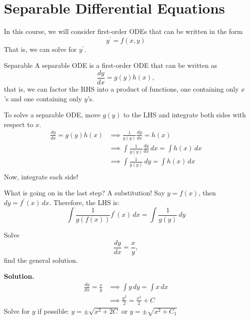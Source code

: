 \section{Separable Differential Equations}
In this course, we will consider first-order ODEs that can be written
in the form
\[ y^\prime=f(x,y) \]
That is, we can solve for $ y^\prime $.

\begin{Definition}{Separable}{}
    A separable ODE is a first-order ODE that can be written as
    \[ \frac{dy}{dx} =g(y)h(x), \]
    that is, we can factor the RHS into a product of functions, one containing
    only $ x $'s and one containing only $ y $'s.
\end{Definition}
To solve a separable ODE, move $ g(y) $ to the LHS and integrate both sides with respect
to $ x $.
\begin{align*}
    \frac{dy}{dx} =g(y)h(x)
     & \implies \frac{1}{g(y)}\frac{dy}{dx} =h(x)                          \\
     & \implies \int \frac{1}{g(y)}\frac{dy}{dx} \, d{x} =\int h(x)\, d{x} \\
     & \implies \int \frac{1}{g(y)} \, d{y} =\int h(x)\, d{x}              \\
\end{align*}
Now, integrate each side!
\begin{Remark}{}{}
    What is going on in the last step? A substitution! Say $ y=f(x) $,
    then $ dy=f^\prime(x)\,dx $. Therefore, the LHS is:
    \[ \int \frac{1}{g(f(x))} f^\prime(x)\, d{x} =\int \frac{1}{g(y)} \, d{y} \]
\end{Remark}

\begin{Example}{}{}
    Solve
    \[ \frac{dy}{dx} =\frac{x}{y}, \]
    find the general solution.

    \textbf{Solution.}
    \begin{align*}
        \frac{dy}{dx} =\frac{x}{y}
         & \implies \int y\, d{y} =\int x\, d{x}   \\
         & \implies \frac{y^2}{2} =\frac{x^2}{2}+C
    \end{align*}
    Solve for $ y $ if possible: $ y=\pm\sqrt{x^2+2C} $ or $ y=\pm\sqrt{x^2+C_1} $
\end{Example}

